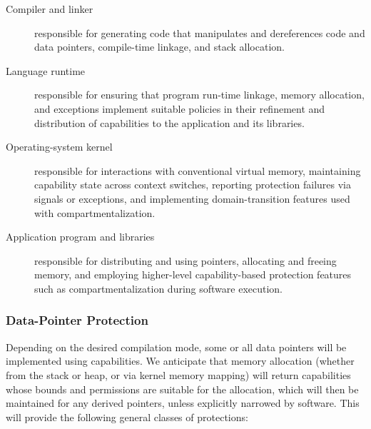 \begin{description}

\item[Compiler and linker] responsible for generating code that manipulates
  and dereferences code and data pointers, compile-time linkage, and 
  stack allocation.

\item[Language runtime] responsible for ensuring that program run-time
  linkage, memory allocation, and exceptions implement suitable policies in
  their refinement and distribution of capabilities to the application and its
  libraries.

\item[Operating-system kernel] responsible for interactions with conventional
  virtual memory, maintaining capability state across context switches,
  reporting protection failures via signals or exceptions, and implementing
  domain-transition features used with compartmentalization.

\item[Application program and libraries] responsible for distributing and
  using pointers, allocating and freeing memory, and employing higher-level
  capability-based protection features such as compartmentalization during
  software execution.

\end{description}

\subsubsection{Data-Pointer Protection}

Depending on 
the desired 
compilation mode, some or all data pointers will be implemented
using capabilities.
We anticipate that memory allocation (whether from the stack or heap, or via
kernel memory mapping) will return capabilities whose bounds and permissions
are suitable for the allocation, which will then be maintained for any derived
pointers, unless explicitly narrowed by software.
This will provide the following general classes of protections:

